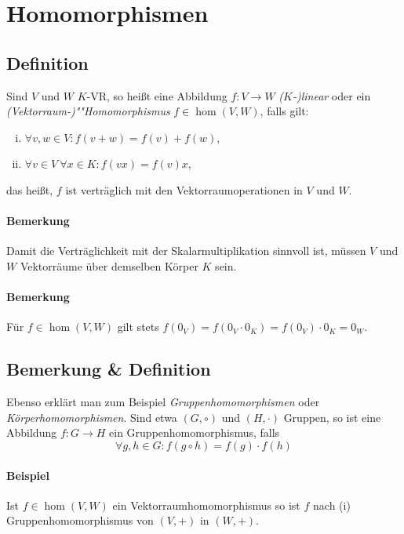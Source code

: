 \section{Homomorphismen}
 \subsection{Definition}
 	\begin{Definition}[Homomorphismus]
 		Sind $ V $ und $ W $ $ K $-VR, so heißt eine Abbildung $f: V \rightarrow W$ \emph{($K$-)linear} oder ein \emph{(Vektorraum-)""Homomorphismus} $f\in \hom(V,W)$, falls gilt:

 		\begin{enumerate}[(i)]
 			\item $\forall v,w \in V: f(v+w) = f(v) + f(w)$,
 			\item $\forall v\in V\ \forall x\in K: f(vx) = f(v)x$,
 		\end{enumerate}

 		das heißt, $ f $ ist verträglich mit den Vektorraumoperationen in $ V $ und $ W $.
 	\end{Definition}

 	\paragraph{Bemerkung}
 		Damit die Verträglichkeit mit der Skalarmultiplikation sinnvoll ist, müssen $ V $ und $ W $ Vektorräume über demselben Körper $ K $ sein.

 	\paragraph{Bemerkung}
 		Für $f\in \hom(V,W)$ gilt stets $f(0_V) = f(0_V\cdot0_K) = f(0_V)\cdot0_K = 0_W$.

 \subsection{Bemerkung \& Definition}
 	Ebenso erklärt man zum Beispiel \emph{Gruppenhomomorphismen} oder \emph{Körperhomomorphismen}. Sind etwa $(G,\circ)$ und $(H,\cdot)$ Gruppen, so ist eine Abbildung $f: G \to H$ ein Gruppenhomomorphismus, falls
 	\begin{equation*}
 		\forall g,h \in G: f(g\circ h) = f(g) \cdot f(h)
 	\end{equation*}

 	\paragraph{Beispiel}
 		Ist $f\in \hom(V,W)$ ein Vektorraumhomomorphismus so ist $ f $ nach (i) Gruppenhomomorphismus von $ (V,+) $ in $ (W,+) $.

